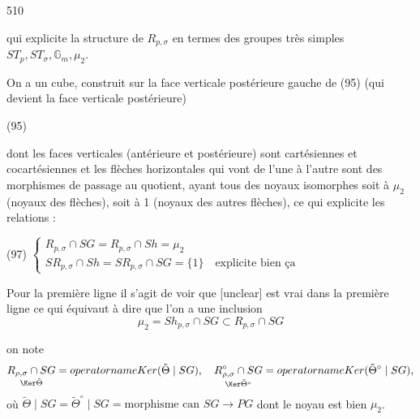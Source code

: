 \begin{enumerate}
\newpage


510

qui explicite la structure de $R_{p,\sigma}$ en termes
des groupes très simples $ST_p, ST_\sigma, \mathbb{G}_m, \mu_2$.

On a un cube, construit sur la face
verticale postérieure gauche de (95) (qui devient la
face verticale postérieure)

(95)

dont les faces verticales (antérieure et
postérieure) sont cartésiennes et cocartésiennes
et les flèches horizontales qui vont de l'une à
l'autre sont des morphismes de passage
au quotient, ayant tous des noyaux isomorphes
soit à $\mu_2$ (noyaux des flèches), soit à 1
(noyaux des autres flèches), ce qui
explicite les relations :

(97)
$\begin{cases}
R_{p,\sigma} \cap S G = R_{p,\sigma} \cap S h = \mu_2 \\
S R_{p,\sigma} \cap S h = S R_{p,\sigma} \cap S G = \{1\} \quad \text{explicite bien ça}
\end{cases}$

Pour la première ligne il s'agit de voir que
[unclear] est vrai dans la première ligne
ce qui équivaut à dire que l'on a une inclusion
$$\mu_2 = Sh_{p,\sigma} \cap S G \subset R_{p,\sigma} \cap S G$$

\newpage


on note
$$ \underset{\Ker \tilde{\Theta}}{R_{\rho,\sigma} \cap SG} = \\operatorname{Ker}(\tilde{\Theta} \mid SG), \quad \underset{\Ker \tilde{\Theta}^\circ}{R_{\rho,\sigma}^\circ \cap SG} = \\operatorname{Ker}(\tilde{\Theta}^\circ \mid SG), $$
où $\tilde{\Theta} \mid SG = \tilde{\Theta}^\circ \mid SG = \text{morphisme can } SG \to PG$
dont le noyau est bien $\mu_2$.


\end{enumerate}
